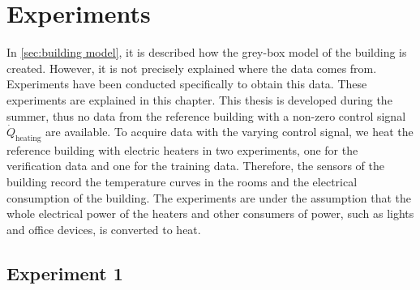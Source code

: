 \chapter{Experiments}
\label{ch:experiments}
In \autoref{sec:building model}, it is described how the grey-box model of the building is created. However, it is not precisely explained where the data comes from. Experiments have been conducted specifically to obtain this data. These experiments are explained in this chapter. \newline
This thesis is developed during the summer, thus no data from the reference building with a non-zero control signal $\dot{Q}_\text{heating}$ are available. To acquire data with the varying control signal, we heat the reference building with electric heaters in two experiments, one for the verification data and one for the training data. Therefore, the sensors of the building record the temperature curves in the rooms and the electrical consumption of the building. The experiments are under the assumption that the whole electrical power of the heaters and other consumers of power, such as lights and office devices, is converted to heat.

\section{Experiment 1}
\label{sec:Experiment1}

